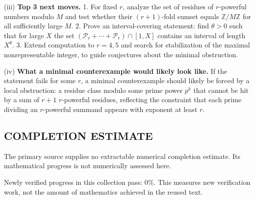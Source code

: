 (iii) \textbf{Top 3 next moves.}
1. For fixed $r$, analyze the set of residues of $r$-powerful numbers modulo $M$ and test whether their $(r+1)$-fold sumset equals $\mathbb{Z}/M\mathbb{Z}$ for all sufficiently large $M$.
2. Prove an interval-covering statement: find $\theta>0$ such that for large $X$ the set $(\mathcal{P}_r+\cdots+\mathcal{P}_r)\cap [1,X]$ contains an interval of length $X^\theta$.
3. Extend computation to $r=4,5$ and search for stabilization of the maximal nonrepresentable integer, to guide conjectures about the minimal obstruction.

(iv) \textbf{What a minimal counterexample would likely look like.}
If the statement fails for some $r$, a minimal counterexample should likely be forced by a local obstruction: a residue class modulo some prime power $p^k$ that cannot be hit by a sum of $r+1$ $r$-powerful residues, reflecting the constraint that each prime dividing an $r$-powerful summand appears with exponent at least $r$.




\subsection*{COMPLETION ESTIMATE}
The primary source supplies no extractable numerical completion estimate. Its mathematical progress is not numerically assessed here.

Newly verified progress in this collection pass: $0\%$. This measures new verification work, not the amount of mathematics achieved in the reused text.
